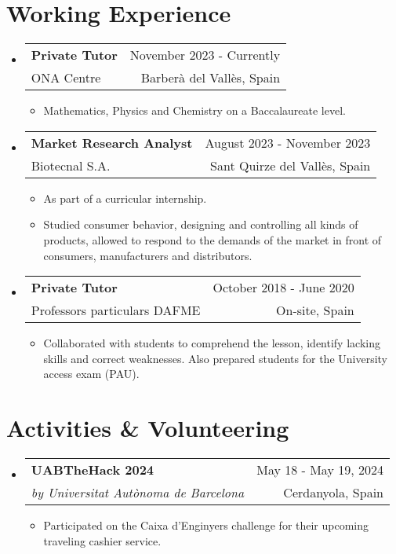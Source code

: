 \documentclass[a4paper,11pt]{article}
\makeatletter
\newcommand{\resumeQuadHeading}[4]{
	\item
	\begin{tabular*}{0.96\textwidth}[t]{l@{\extracolsep{\fill}}r}
		\textbf{#1} & \small #2 \\
		\small#3 & \small #4 \\
	\end{tabular*}
}
\newcommand{\resumeHeadingListStart}{
	\begin{itemize}[leftmargin=0.15in, label={}]
	}
\newcommand{\resumeHeadingListEnd}{\end{itemize}}
\makeatother
\begin{document}
	
	\section{Working Experience}	
	\resumeHeadingListStart{}
	\resumeQuadHeading{Private Tutor}{November 2023 - Currently}
	{ONA Centre}{Barberà del Vallès, Spain}
	\begin{itemize}[leftmargin=3em, itemsep=0.1em, topsep=2pt]
		\item \small Mathematics, Physics and Chemistry on a Baccalaureate level.
	\end{itemize}
	\resumeHeadingListEnd{}
	
	\resumeHeadingListStart{}
	\resumeQuadHeading{Market Research Analyst}{August 2023 - November 2023}
	{Biotecnal S.A.}{Sant Quirze del Vallès, Spain}
	\begin{itemize}[leftmargin=3em, itemsep=0.1em, topsep=2pt]
		\item \small As part of a curricular internship.
		\item \small Studied consumer behavior, designing and controlling all kinds of products, allowed to respond to the demands of the market in front of consumers, manufacturers and distributors.
	\end{itemize}
	\resumeHeadingListEnd{}
	
	\resumeHeadingListStart{}
	\resumeQuadHeading{Private Tutor}{October 2018 - June 2020}
	{Professors particulars DAFME}{On-site, Spain}
	\begin{itemize}[leftmargin=3em, itemsep=0.1em, topsep=2pt]
		\item \small Collaborated with students to comprehend the lesson, identify lacking skills and correct weaknesses. Also prepared students for the University access exam (PAU).
	\end{itemize}
	\resumeHeadingListEnd{}
	
	\section{Activities \& Volunteering}
	\resumeHeadingListStart{}
	\resumeQuadHeading{UABTheHack 2024}{May 18 - May 19, 2024}{\textit{by Universitat Autònoma de Barcelona}}{Cerdanyola, Spain}
	\begin{itemize}[leftmargin=3em, itemsep=0.1em, topsep=2pt]
		\item \small Participated on the Caixa d'Enginyers challenge for their upcoming traveling cashier service.
	\end{itemize}
	\resumeHeadingListEnd{}
	
\end{document}
